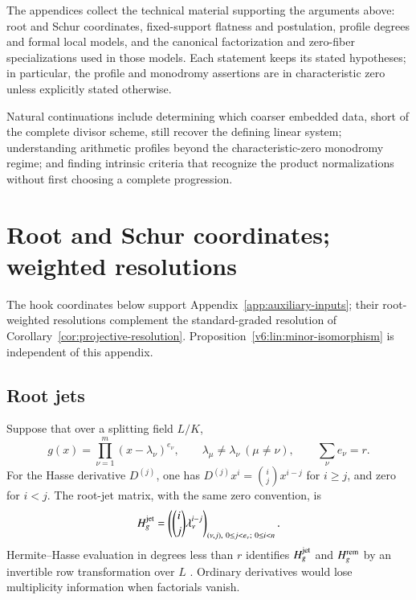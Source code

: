 \documentclass[10pt,fleqn]{article}
\numberwithin{equation}{section}
\begin{document}
The appendices collect the technical material supporting the arguments
above: root and Schur coordinates, fixed-support flatness and postulation,
profile degrees and formal local models, and the canonical factorization and
zero-fiber specializations used in those models.  Each statement keeps its
stated hypotheses; in particular, the profile and monodromy assertions are in
characteristic zero unless explicitly stated otherwise.

Natural continuations include determining which coarser embedded data, short
of the complete divisor scheme, still recover the defining linear system;
understanding arithmetic profiles beyond the characteristic-zero monodromy
regime; and finding intrinsic criteria that recognize the product
normalizations without first choosing a complete progression.
\appendix
\section{Root and Schur coordinates; weighted resolutions}\label{v6:app:coordinates}

The hook coordinates below support Appendix~\ref{app:auxiliary-inputs};
their root-weighted resolutions complement the standard-graded
resolution of Corollary~\ref{cor:projective-resolution}.
Proposition~\ref{v6:lin:minor-isomorphism} is independent of this appendix.


\subsection{Root jets}

Suppose that over a splitting field $L/K$,
\begin{equation}\label{eq:root-factorization}
 g(x)=\prod_{\nu=1}^{m}(x-\lambda_\nu)^{e_\nu},
 \qquad \lambda_\mu\ne\lambda_\nu\ (\mu\ne\nu),
 \qquad \sum_\nu e_\nu=r.
\end{equation}
For the Hasse derivative $D^{(j)}$, one has
$D^{(j)}x^i=\binom{i}{j}x^{i-j}$ for $i\ge j$, and zero for $i<j$.
The root-jet matrix, with the same zero convention, is
\begin{equation}\label{eq:root-jet}
 H_g^{\rm jet}=
 \left(\binom{i}{j}\lambda_\nu^{i-j}\right)_{
 (\nu,j),\ 0\le j<e_\nu;\ 0\le i<n}.
\end{equation}
Hermite--Hasse evaluation in degrees less than $r$ identifies
$H_g^{\rm jet}$ and $H_g^{\rm rem}$ by an invertible row transformation over $L$
\cite[Theorem 3.4]{LiYuanOrbits}.  Ordinary derivatives would lose
multiplicity information when factorials vanish.
\end{document}

